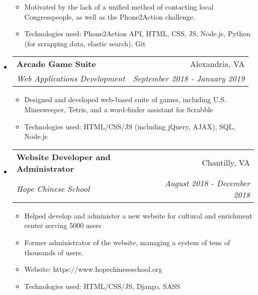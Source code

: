 \documentclass[letterpaper,11pt]{article}
\makeatletter
\newcommand{\resitem}[1]{\item #1 \vspace{-2pt}}
\newcommand{\ressubheading}[4]{
\begin{tabular*}{7.0in}{l@{\extracolsep{\fill}}r}
		\textbf{#1} & #2 \\
		\textit{#3} & \textit{#4} \\
\end{tabular*}\vspace{-6pt}}
\makeatother
\begin{document}
\begin{itemize}
\begin{itemize}
		\resitem{Motivated by the lack of a unified method of contacting local Congresspeople, as well as the Phone2Action challenge.}
		\resitem{Technologies used: Phone2Action API, HTML, CSS, JS, Node.js, Python (for scrapping data, elastic search), Git}
	\end{itemize}
\item
    \ressubheading{Arcade Game Suite}{Alexandria, VA}{Web Applications Development}{September 2018 - January 2019}
	\begin{itemize}
		\resitem{Designed and developed web-based suite of games, including U.S. Minesweeper, Tetris, and a word-finder assistant for Scrabble}
		\resitem{Technologies used: HTML/CSS/JS (including jQuery, AJAX), SQL, Node.js}
	\end{itemize}
\item
    \ressubheading{Website Developer and Administrator}{Chantilly, VA}{Hope Chinese School}{August 2018 - December 2018}
	\begin{itemize}
	    \resitem{Helped develop and administer a new website for cultural and enrichment center serving 5000 users}
		\resitem{Former administrator of the website, managing a system of tens of thousands of users.}
		\resitem{Website: https://www.hopechineseschool.org}
		\resitem{Technologies used: HTML/CSS/JS, Django, SASS}
	\end{itemize}

\end{itemize}
\end{document}
